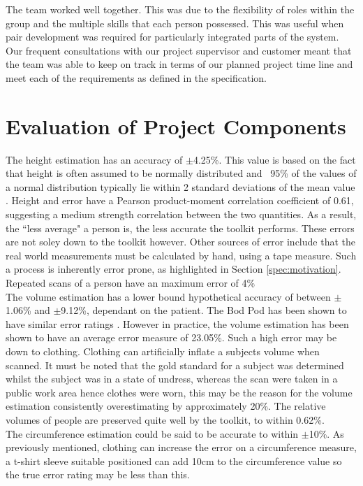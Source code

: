 The team worked well together. This was due to the flexibility of roles within the group and the multiple skills that each person possessed. This was useful when pair development was required for particularly integrated parts of the system. Our frequent consultations with our project supervisor and customer meant that the team was able to keep on track in terms of our planned project time line and meet each of the requirements as defined in the specification.

\section{Evaluation of Project Components}

The height estimation has an accuracy of $\pm$4.25\%. This value is based on the fact that height is often assumed to be normally distributed \cite{chali1995} and ~95\% of the values of a normal distribution typically lie within 2 standard deviations of the mean value \cite{pukelsheim1994}. Height and error have a Pearson product-moment correlation coefficient of 0.61, suggesting a medium strength correlation \cite{cohen88,buda2011} between the two quantities. As a result, the ``less average" a person is, the less accurate the toolkit performs. These errors are not soley down to the toolkit however. Other sources of error include that the real world measurements must be calculated by hand, using a tape measure. Such a process is inherently error prone, as highlighted in Section \ref{spec:motivation}. Repeated scans of a person have an maximum error of 4\%\\ 

The volume estimation has a lower bound hypothetical accuracy of between $\pm$1.06\% and $\pm$9.12\%, dependant on the patient. The Bod Pod has been shown to have similar error ratings \cite{fields2001,collins2004}. However in practice, the volume estimation has been shown to have an average error measure of 23.05\%. Such a high error may be down to clothing. Clothing can artificially inflate a subjects volume \cite{shafer2008} when scanned. It must be noted that the gold standard for a subject was determined whilst the subject was in a state of undress, whereas the scan were taken in a public work area hence clothes were worn, this may be the reason for the volume estimation consistently overestimating by approximately 20\%. The relative volumes of people are preserved quite well by the toolkit, to within 0.62\%.\\

The circumference estimation could be said to be accurate to within $\pm$10\%. As previously mentioned, clothing can increase the error on a circumference measure, a t-shirt sleeve suitable positioned can add 10cm to the circumference value so the true error rating may be less than this.\\

